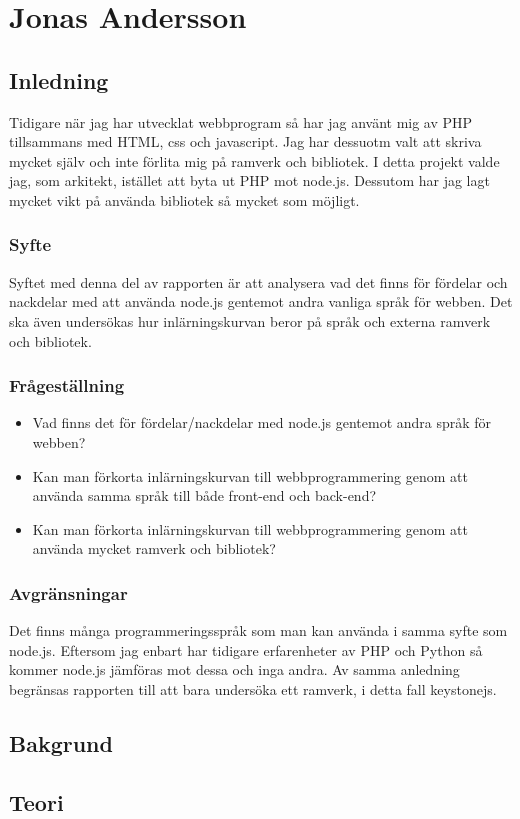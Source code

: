\section{Jonas Andersson}
\subsection{Inledning} 
Tidigare när jag har utvecklat webbprogram så har jag använt mig av PHP tillsammans med HTML, css och javascript. Jag har dessuotm valt att skriva mycket själv och inte förlita mig på ramverk och bibliotek. I detta projekt valde jag, som arkitekt, istället att byta ut PHP mot node.js. Dessutom har jag lagt mycket vikt på använda bibliotek så mycket som möjligt.
\subsubsection{Syfte}
Syftet med denna del av rapporten är att analysera vad det finns för fördelar och nackdelar med att använda node.js gentemot andra vanliga språk för webben. Det ska även undersökas hur inlärningskurvan beror på språk och externa ramverk och bibliotek.
\subsubsection{Frågeställning}
\begin{itemize}
  \item Vad finns det för fördelar/nackdelar med node.js gentemot andra språk för webben?
  \item Kan man förkorta inlärningskurvan till webbprogrammering genom att använda samma språk till både front-end och back-end?
  \item Kan man förkorta inlärningskurvan till webbprogrammering genom att använda mycket ramverk och bibliotek?
\end{itemize}
\subsubsection{Avgränsningar}
Det finns många programmeringsspråk som man kan använda i samma syfte som node.js. Eftersom jag enbart har tidigare erfarenheter av PHP och Python så kommer node.js jämföras mot dessa och inga andra. Av samma anledning begränsas rapporten till att bara undersöka ett ramverk, i detta fall keystonejs.
\subsection{Bakgrund}
\subsection{Teori}
